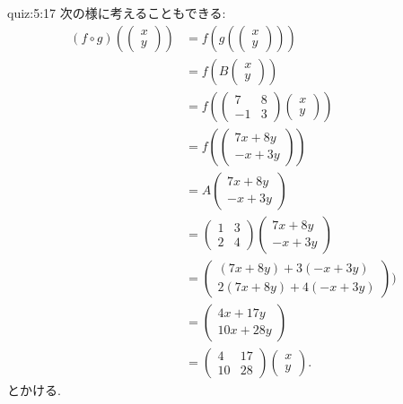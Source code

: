 \begin{answerof}{quiz:5:17}
  次の様に考えることもできる:
  \begin{align*}
    (f\circ g)(\begin{pmatrix}x\\y\end{pmatrix})
    &=f(g(\begin{pmatrix}x\\y\end{pmatrix}))\\
    &=f(B\begin{pmatrix}x\\y\end{pmatrix})\\
    &=f(\begin{pmatrix}7&8\\-1&3\end{pmatrix}\begin{pmatrix}x\\y\end{pmatrix})\\
    &=f(\begin{pmatrix}7x+8y\\-x+3y\end{pmatrix})\\
    &=A\begin{pmatrix}7x+8y\\-x+3y\end{pmatrix}\\
    &=\begin{pmatrix}1&3\\2&4\end{pmatrix}\begin{pmatrix}7x+8y\\-x+3y\end{pmatrix}\\
    &=\begin{pmatrix}(7x+8y)+3(-x+3y)\\2(7x+8y)+4(-x+3y)\end{pmatrix})\\
    &=\begin{pmatrix}4x+17y\\10x+28y\end{pmatrix}\\
    &=\begin{pmatrix}4&17\\10&28\end{pmatrix}\begin{pmatrix}x\\y\end{pmatrix}.
  \end{align*}
  とかける.
\end{answerof}



